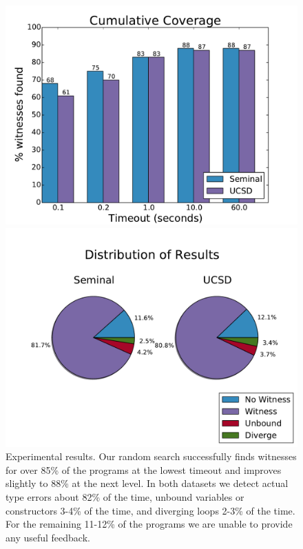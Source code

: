\begin{figure}[t]
\centering
\begin{minipage}{\linewidth}
\includegraphics[width=\linewidth]{coverage.pdf}
\end{minipage}
\begin{minipage}{\linewidth}
\includegraphics[width=\linewidth]{distrib.pdf}
\end{minipage}
\caption{Experimental results. Our random search successfully finds
  witnesses for over 85\% of the programs at the lowest timeout and
  improves slightly to 88\% at the next level. In both datasets we
  detect actual type errors about 82\% of the time, unbound variables or
  constructors 3-4\% of the time, and diverging loops 2-3\% of the
  time. For the remaining 11-12\% of the programs we are unable to
  provide any useful feedback. 
}
\label{fig:results-witness}
\end{figure}

